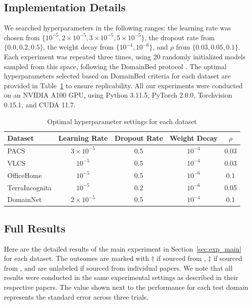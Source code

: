 \documentclass{article}
\theoremstyle{plain}
\theoremstyle{definition}
\theoremstyle{remark}
\begin{document}
\subsection{Implementation Details}\label{subsec:implementation}
We searched hyperparameters in the following ranges: the learning rate was chosen from \(\{10^{-5}, 2 \times 10^{-5}, 3 \times 10^{-5}, 5 \times 10^{-5}\}\), the dropout rate from \(\{0.0, 0.2, 0.5\}\), the weight decay from \(\{10^{-4}, 10^{-6}\}\), and \(\rho\) from \(\{0.03, 0.05, 0.1\}\). Each experiment was repeated three times, using 20 randomly initialized models sampled from this space, following the DomainBed protocol \cite{gulrajani2021domainbed}. The optimal hyperparameters selected based on DomainBed criteria for each dataset are provided in Table~\ref{tab:optimal_hparams} to ensure replicability.  All our experiments were conducted on an NVIDIA A100 GPU, using Python 3.11.5, PyTorch 2.0.0, Torchvision 0.15.1, and CUDA 11.7.





\begin{table}[!ht]
\centering\captionsetup{justification=centering, skip=2pt}
\small
\caption{Optimal hyperparameter settings for each dataset}\label{tab:optimal_hparams}
\begin{tabular}{l|cccc}
\hline
Dataset          & Learning Rate  & Dropout Rate & Weight Decay  & $\rho$  \\ \toprule
PACS             & \(3 \times 10^{-5}\) & 0.5          & \(10^{-4}\)      & 0.03     \\
VLCS             & \(10^{-5}\)         & 0.5          & \(10^{-4}\)      & 0.03     \\
OfficeHome       & \(10^{-5}\)         & 0.5          & \(10^{-6}\)      & 0.1      \\
TerraIncognita   & \(10^{-5}\)         & 0.2          & \(10^{-6}\)      & 0.05     \\
DomainNet        & \(2 \times 10^{-5}\) & 0.5          & \(10^{-4}\)      & 0.1      \\ \bottomrule
\end{tabular}

\end{table}




\subsection{Full Results}\label{app:full_results}
Here are the detailed results of the main experiment in Section~\ref{sec:exp_main} for each dataset. The outcomes are marked with \(\dag\) if sourced from \citet{wang2023sagm}, \(\ddag\) if sourced from \citet{zhang2023fad}, and are unlabeled if sourced from individual papers. We note that all results were conducted in the same experimental settings as described in their respective papers. The value shown next to the performance for each test domain represents the standard error across three trials.
\end{document}
